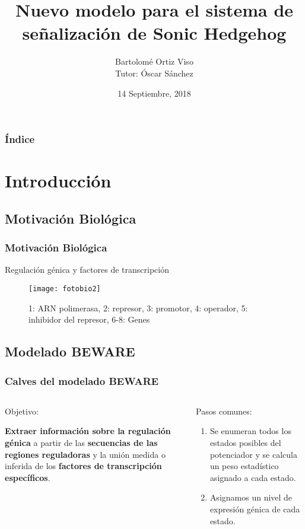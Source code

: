 \documentclass{beamer}
\title[Sonic Hedgehog signaling system]{
  Nuevo modelo para el sistema de señalización de Sonic Hedgehog}
\subtitle{}
\author[Bartolomé Ortiz Viso]{
  Bartolomé Ortiz Viso \\\medskip
  {\small Tutor: Óscar Sánchez} }
\institute[Universidad de Granada]{
  Trabajo Fin de Máster  \\
  Máster en Física y Matemáticas}
\date[14 Septiembre, 2018]{
  14 Septiembre, 2018}
\begin{document}
\begin{frame}
  \titlepage
\end{frame}

\begin{frame}
  \frametitle{Índice}
  \tableofcontents
\end{frame}

\section{Introducción}

\subsection{Motivación Biológica}
\begin{frame}
  \frametitle{Motivación Biológica}
\begin{center}
	Regulación génica y factores de transcripción
	
	\begin{figure}[h]
		\texttt{[image: fotobio2]}
		\centering
		\caption{\small{1: ARN polimerasa, 2: represor, 3: promotor, 4: operador, 5: inhibidor del represor, 6-8: Genes}}
	\end{figure} 
\end{center}
\end{frame}

\subsection{Modelado BEWARE}
\begin{frame}
\frametitle{Calves del modelado BEWARE}
\begin{columns}
	\begin{column}{0.5\textwidth}
		{Objetivo:}
		
		\textbf{Extraer información sobre la regulación génica} a partir de las \textbf{secuencias de las regiones reguladoras} y la unión medida o inferida de los\textbf{ factores de transcripción específicos}.
		
	\end{column}
	\begin{column}{0.5\textwidth}
		 {Pasos comunes:}
		
		\begin{enumerate}
			
			\item  Se enumeran todos los estados posibles del potenciador y se calcula un peso estadístico asignado a cada estado.
			\item Asignamos un nivel de expresión génica de cada estado.
		\end{enumerate}
	\end{column}
\end{columns}


\end{frame}
\end{document}
